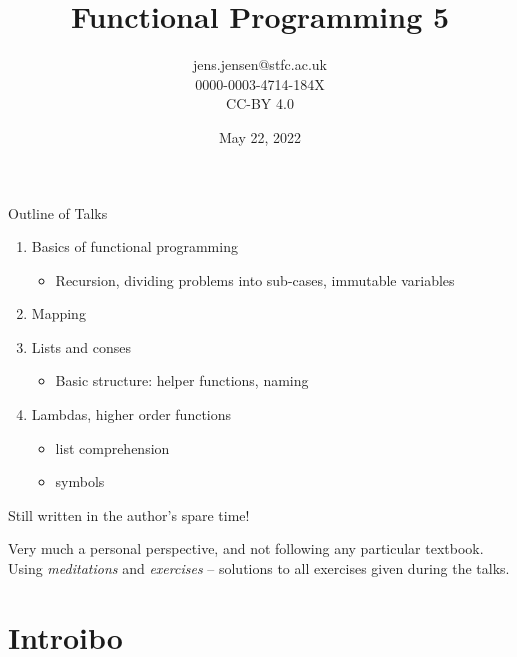 \documentclass[presentation]{beamer}
\author{jens.jensen@stfc.ac.uk \\0000-0003-4714-184X\\CC-BY 4.0}
\date{May 22, 2022}
\title{Functional Programming 5}
\begin{document}
\maketitle
\begin{frame}{Outline of Talks}

  \begin{enumerate}
  \item Basics of functional programming
    \begin{itemize}
    \item Recursion, dividing problems into sub-cases, immutable variables
    \end{itemize}
  \item Mapping
  \item Lists and conses
    \begin{itemize}
    \item Basic structure: helper functions, naming
    \end{itemize}
  \item Lambdas, higher order functions
    \begin{itemize}
    \item list comprehension
    \item symbols
    \end{itemize}
  \end{enumerate}

Still written in the author's spare time!

Very much a personal perspective, and not following any particular textbook.  Using \emph{meditations} and \emph{exercises} -- solutions to all exercises given during the talks.

\end{frame}


\section{Introibo}
\label{sec:org0edb596}
\end{document}
